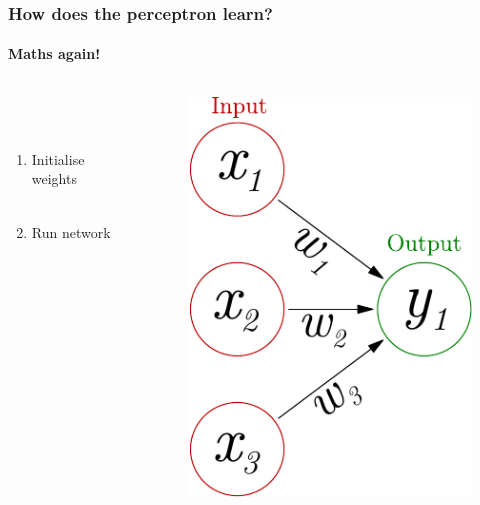 \documentclass{beamer}
\newcommand{\figheight}{0.72\textheight}
\begin{document}
\begin{frame}
\frametitle{How does the perceptron learn?}
\framesubtitle{Maths again!}
  \begin{columns}[T]
    \begin{column}{.45\textwidth} 
    \ \\
    \ \\
\begin{enumerate}

 \item<1-> Initialise weights
 \\ \
 \item<2-> Run network 

%  
%  

 \end{enumerate}

    \end{column}
    \begin{column}{.55\textwidth}
\begin{figure}
 
 \begin{flushleft}

 \includegraphics[height = \figheight]{./fig/perceptron_maths.pdf}


\end{flushleft}
\end{figure}
\end{column}
\end{columns}
\end{frame}
\end{document}
